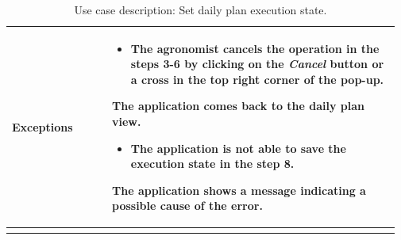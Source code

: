 \begin{longtable}{@{}p{0.25\linewidth} p{0.72\linewidth}@{}}
	\textbf{Exceptions}         & \begin{itemize}[leftmargin=.4cm,noitemsep,topsep=0pt,before=\vspace{-3mm}]
	   \item The agronomist cancels the operation in the steps 3-6 by clicking on the \textit{Cancel} button or a cross in the top right corner of the pop-up.
	\end{itemize}
	The application comes back to the daily plan view.
    \begin{itemize}[leftmargin=.4cm,noitemsep,topsep=0pt]
	   \item The application is not able to save the execution state in the step 8. 
	\end{itemize}
	The application shows a message indicating a possible cause of the error.
    \\\bottomrule
	\caption{Use case description: Set daily plan execution state.} 
\end{longtable}

